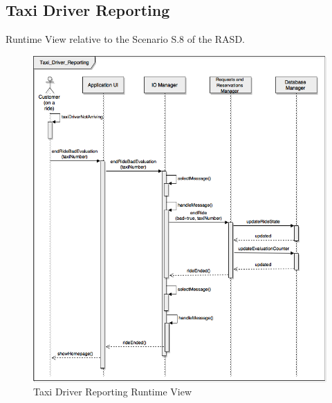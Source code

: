 \documentclass[../../../../../../dd.tex]{subfiles}
\begin{document}
	\subsection{Taxi Driver Reporting}
		Runtime View relative to the Scenario S.8 of the RASD.
		\begin{figure}[H]
				\centering
				\includegraphics[width=\textwidth, scale=0.5]{../images/SequenceDiagrams/taxiDriverReporting.png}
			\caption{Taxi Driver Reporting Runtime View}\label{fig:RuntimeTaxiDriverReporting}
		\end{figure}
		
\end{document}
